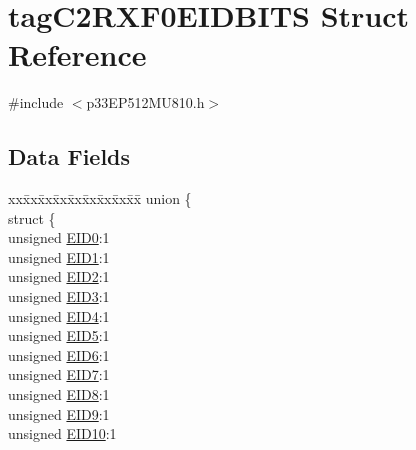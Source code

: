 \hypertarget{structtag_c2_r_x_f0_e_i_d_b_i_t_s}{}\section{tag\+C2\+R\+X\+F0\+E\+I\+D\+B\+I\+TS Struct Reference}
\label{structtag_c2_r_x_f0_e_i_d_b_i_t_s}


{\ttfamily \#include $<$p33\+E\+P512\+M\+U810.\+h$>$}

\subsection*{Data Fields}
\begin{DoxyCompactItemize}
\item 
\begin{tabbing}
xx\=xx\=xx\=xx\=xx\=xx\=xx\=xx\=xx\=\kill
union \{\\
\>struct \{\\
\>\>unsigned \hyperlink{structtag_c2_r_x_f0_e_i_d_b_i_t_s_a9da8b7b30247e4f9cd8cc056549aa9fd}{EID0}:1\\
\>\>unsigned \hyperlink{structtag_c2_r_x_f0_e_i_d_b_i_t_s_afd6c139491d147c1262f3d051c6691e9}{EID1}:1\\
\>\>unsigned \hyperlink{structtag_c2_r_x_f0_e_i_d_b_i_t_s_a36ec62d8d3c5acd5d15e6691dc099a94}{EID2}:1\\
\>\>unsigned \hyperlink{structtag_c2_r_x_f0_e_i_d_b_i_t_s_ab895f7d0ac289a0383b607cbc62eebe2}{EID3}:1\\
\>\>unsigned \hyperlink{structtag_c2_r_x_f0_e_i_d_b_i_t_s_a136d5a709d6618d40acceccb43036656}{EID4}:1\\
\>\>unsigned \hyperlink{structtag_c2_r_x_f0_e_i_d_b_i_t_s_a8dffb2d86a6c184df505ae7c71a58710}{EID5}:1\\
\>\>unsigned \hyperlink{structtag_c2_r_x_f0_e_i_d_b_i_t_s_af8a8574102515d8f1a4b7fd1685d0532}{EID6}:1\\
\>\>unsigned \hyperlink{structtag_c2_r_x_f0_e_i_d_b_i_t_s_a84c3262e67f8d5fd387ac10bde6fa9b1}{EID7}:1\\
\>\>unsigned \hyperlink{structtag_c2_r_x_f0_e_i_d_b_i_t_s_acca25e0b7d86eb499d01f85222baea87}{EID8}:1\\
\>\>unsigned \hyperlink{structtag_c2_r_x_f0_e_i_d_b_i_t_s_ac6748f73d4ada8538b06548be4f396c2}{EID9}:1\\
\>\>unsigned \hyperlink{structtag_c2_r_x_f0_e_i_d_b_i_t_s_a9cea8e77ecbb72bd3b08102412793725}{EID10}:1\\

\end{tabbing}
\end{DoxyCompactItemize}
